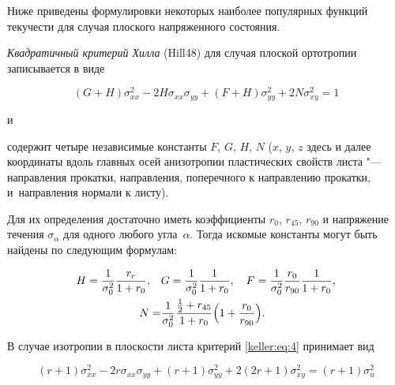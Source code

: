 Ниже приведены формулировки некоторых наиболее популярных функций текучести для случая плоского напряженного состояния.



\smallskip



{\it Квадратичный критерий Хилла} ({\small\sc Hill48}) \cite{keller:bib:hill1948} для случая плоской ортотропии записывается в виде

\begin{equation}\label{keller:eq:4}

\left( G + H \right) \sigma_{xx}^2 - 2H\sigma_{xx}\sigma_{yy} + \left( F + H \right) \sigma_{yy}^2 + 2N\sigma_{xy}^2 = 1

\end{equation} 

и

содержит четыре независимые константы $F$, $G$, $H$, $N$ ($x$, $y$, $z$ здесь и далее координаты вдоль главных осей анизотропии пластических свойств листа "--- направления прокатки, направления, поперечного к направлению прокатки, и~направления нормали к листу). 

Для их определения достаточно иметь коэффициенты $r_0$, $r_{45}$, $r_{90}$ и напряжение течения $\sigma_\alpha$ для одного любого угла~$\alpha.$ Тогда искомые константы могут быть найдены по следующим формулам:

\begin{equation}

	\begin{split}

	H = \dfrac{1}{\sigma_0^2}\dfrac{r_r}{1+r_0},\quad & G = \dfrac{1}{\sigma_0^2}\dfrac{1}{1+r_0},\quad F = \dfrac{1}{\sigma_0^2}\dfrac{r_0}{r_{90}}\dfrac{1}{1+r_0}, \\

	N = & \dfrac{1}{\sigma_0^2}\dfrac{\tfrac{1}{2} + r_{45}}{1 + r_0}\Bigl( 1 + \dfrac{r_0}{r_{90}} \Bigr).

	\end{split}

\end{equation}



В случае изотропии в плоскости листа критерий \eqref{keller:eq:4} принимает вид

\begin{equation}

( r + 1 ) \sigma_{xx}^2 - 2r\sigma_{xx}\sigma_{yy} + ( r + 1 ) \sigma_{yy}^2 + 2(2r+1)\sigma_{xy}^2 = (r+1)\sigma_u^2

\end{equation}

